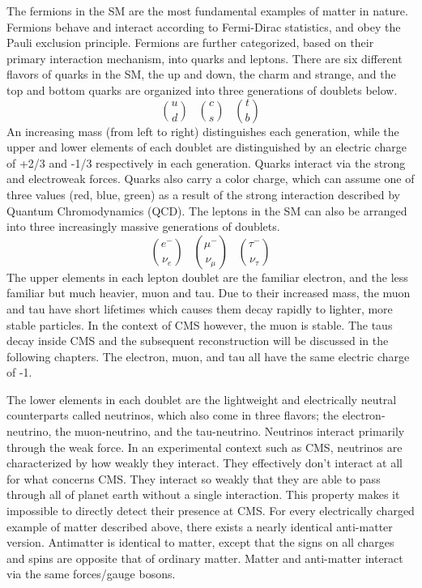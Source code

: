 The fermions in the SM are the most fundamental examples of matter in nature. Fermions behave and interact according to Fermi-Dirac statistics, and obey the Pauli exclusion principle. Fermions are further categorized, based on their primary interaction mechanism,
into quarks and leptons. There are six different flavors of quarks in the SM, the up and down, the charm and strange, and the top and bottom quarks are organized into three generations of doublets below.
\begin{equation}
\binom{u}{d} \;\;\; \binom{c}{s} \;\;\; \binom{t}{b}
\end{equation}
\noindent An increasing mass (from left to right) distinguishes each generation, while the upper and lower elements of each doublet are distinguished by an electric charge of +2/3 and -1/3 respectively in each generation. Quarks interact via the strong and
electroweak forces. Quarks also carry a color charge, which can assume one of three values (red, blue, green) as a result of the strong interaction described by Quantum Chromodynamics (QCD). The leptons in the SM can also be arranged into three increasingly
massive generations of doublets.
\begin{equation}
\binom{e^{-}}{\nu_{e}} \;\;\; \binom{\mu^{-}}{\nu_{\mu}} \;\;\; \binom{\tau^{-}}{\nu_{\tau}}
\end{equation}
\noindent The upper elements in each lepton doublet are the familiar electron, and the less familiar but much heavier, muon and tau. Due to their increased mass, the muon and tau have short lifetimes which causes them decay rapidly to lighter, more stable particles. In the context of CMS however, the muon is stable. The taus decay inside CMS and the
subsequent reconstruction will be discussed in the following chapters. 
The electron, muon, and tau all have the same electric charge of -1.

The lower elements in each doublet are the lightweight and electrically neutral counterparts called neutrinos, which also come in three
flavors; the electron-neutrino, the muon-neutrino, and the tau-neutrino. Neutrinos interact primarily through the weak force. In an experimental context such as CMS, neutrinos are characterized by
how weakly they interact. They effectively don't interact at all for what concerns CMS. They interact so weakly that they are able to pass through all of planet earth without a single interaction.
This property makes it impossible to directly detect their presence at CMS. For every electrically charged example of matter described above, there exists a nearly identical anti-matter version. Antimatter is identical to matter, except that the
signs on all charges and spins are opposite that of ordinary matter. Matter and anti-matter interact via the same forces/gauge bosons. 

